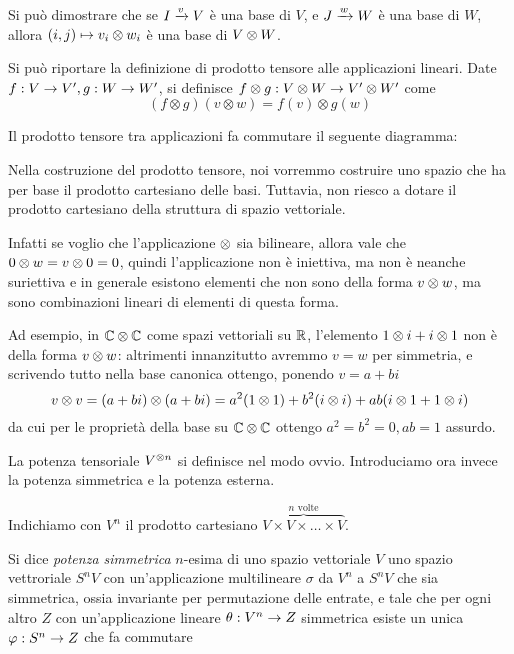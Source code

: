   Si può dimostrare che se $I \xrightarrow v V$ è una base di $V$, e $J \xrightarrow w W$ è una base di $W$, allora $(i,j) \mapsto v_i \otimes w_i$ è una base di $V\otimes W$.

  \begin{mydef}
    Si può riportare la definizione di prodotto tensore alle applicazioni lineari. Date $f:V \rightarrow V', g: W \rightarrow W'$, si definisce $f\otimes g: V\otimes W \rightarrow V'\otimes W'$ come
      \[
	(f \otimes g)(v\otimes w)=f(v)\otimes g(w) 
      \]
    
    Il prodotto tensore tra applicazioni fa commutare il seguente diagramma:
    
   
   \end{mydef}

  \begin{myobs}
   Nella costruzione del prodotto tensore, noi vorremmo costruire uno spazio che ha per base il prodotto cartesiano delle basi. Tuttavia, non riesco a dotare il prodotto cartesiano della struttura di spazio vettoriale.
   
   Infatti se voglio che l'applicazione $\otimes$ sia bilineare, allora vale che $0 \otimes w = v \otimes 0 = 0$, quindi l'applicazione non è iniettiva, ma non è neanche suriettiva e in generale esistono elementi che non sono della forma $v \otimes w$, ma sono combinazioni lineari di elementi di questa forma.
  \end{myobs}
  \begin{myexample}
  
   Ad esempio, in $\mathbb C \otimes \mathbb C$ come spazi vettoriali su $\mathbb R$, l'elemento $1 \otimes i + i \otimes 1$ non è della forma $v\otimes w$: altrimenti innanzitutto avremmo $v=w$ per simmetria, e scrivendo tutto nella base canonica ottengo, ponendo $v=a+bi$
   \[
    v\otimes v= (a+bi)\otimes (a+bi) = a^2(1\otimes 1) + b^2 (i\otimes i) + ab(i\otimes 1 +1\otimes i)
   \]
   da cui per le proprietà della base su $\mathbb C\otimes \mathbb C$ ottengo $a^2=b^2=0, ab=1$ assurdo.

  \end{myexample}
  
  La potenza tensoriale $V^{\otimes n}$ si definisce nel modo ovvio. Introduciamo ora invece la potenza simmetrica e la potenza esterna.
   
  \begin{mydef}
   Indichiamo con $V^n$ il prodotto cartesiano $\overbrace{V \times V \times \dots \times V}^{n \textrm{ volte}}$.
   
   Si dice \emph{potenza simmetrica} $n$-esima di uno spazio vettoriale $V$ uno spazio vettroriale $S^nV$ con un'applicazione multilineare $\sigma$ da $V^n$ a $S^nV$ che sia simmetrica, ossia invariante per permutazione delle entrate, e tale che per ogni altro $Z$ con un'applicazione lineare $\theta: V^n \rightarrow Z$ simmetrica esiste un unica $\varphi: S^n \rightarrow Z$ che fa commutare 
   
  
  \end{mydef}
  
